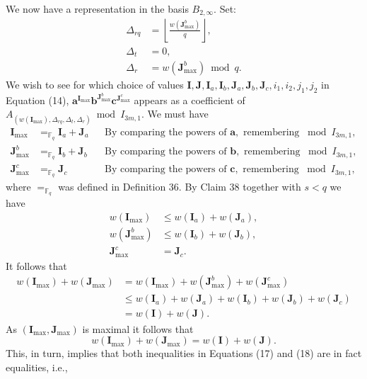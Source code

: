 We now have a representation in the basis $B_{2,\infty}$.
Set:
\begin{align*}
\Delta_{rq}&=\left\lfloor\frac{w(\boldsymbol J_{\max}^b)}q\right\rfloor,\\
\Delta_t&=0,\\
\Delta_r&=w(\boldsymbol J_{\max}^b)\bmod q.\tag{16}
\end{align*}
We wish to see for which choice of values $\boldsymbol I,\boldsymbol J,\boldsymbol I_a,\boldsymbol I_b,\boldsymbol J_a,\boldsymbol J_b,\boldsymbol J_c,i_1,i_2,j_1,j_2$ in Equation (14), $\boldsymbol a^{\boldsymbol I_{\max}}\boldsymbol b^{\boldsymbol J_{\max}^b}\boldsymbol c^{\boldsymbol J_{\max}^c}$ appears as a coefficient of $A_{(w(\boldsymbol I_{\max}),\Delta_{rq},\Delta_t,\Delta_r)}\bmod I_{3m,1}$. We must have
\begin{align*}
\boldsymbol I_{\max}&=_{\mathbb F_q}\boldsymbol I_a+\boldsymbol J_a&&\text{By comparing the powers of }\boldsymbol a,\text{ remembering }\bmod I_{3m,1},\\
\boldsymbol J_{\max}^b&=_{\mathbb F_q}\boldsymbol I_b+\boldsymbol J_b&&\text{By comparing the powers of }\boldsymbol b,\text{ remembering }\bmod I_{3m,1},\\
\boldsymbol J_{\max}^c&=_{\mathbb F_q}\boldsymbol J_c&&\text{By comparing the powers of }\boldsymbol c,\text{ remembering }\bmod I_{3m,1},
\end{align*}
where $=_{\mathbb F_q}$ was defined in Definition 36.
By Claim 38 together with $s<q$ we have
\begin{align*}
w(\boldsymbol I_{\max})&\leq w(\boldsymbol I_a)+w(\boldsymbol J_a),\tag{17}\\
w(\boldsymbol J_{\max}^b)&\leq w(\boldsymbol I_b)+w(\boldsymbol J_b),\tag{18}\\
\boldsymbol J_{\max}^c&=\boldsymbol J_c.\tag{19}
\end{align*}
It follows that
\begin{align*}
w(\boldsymbol I_{\max})+w(\boldsymbol J_{\max})
&=w(\boldsymbol I_{\max})+w(\boldsymbol J_{\max}^b)+w(\boldsymbol J_{\max}^c)\\
&\leq w(\boldsymbol I_a)+w(\boldsymbol J_a)+w(\boldsymbol I_b)+w(\boldsymbol J_b)+w(\boldsymbol J_c)\\
&=w(\boldsymbol I)+w(\boldsymbol J).
\end{align*}
As $(\boldsymbol I_{\max},\boldsymbol J_{\max})$ is maximal it follows that
\[w(\boldsymbol I_{\max})+w(\boldsymbol J_{\max})=w(\boldsymbol I)+w(\boldsymbol J).\tag{20}\]
This, in turn, implies that both inequalities in Equations (17) and (18) are in fact equalities, i.e.,
